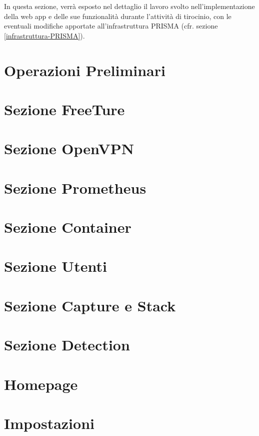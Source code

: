 In questa sezione, verrà esposto nel dettaglio il lavoro svolto nell'implementazione della web app e delle sue funzionalità durante l'attività di tirocinio, con le eventuali modifiche apportate all'infrastruttura PRISMA (cfr. sezione \ref{infrastruttura-PRISMA}).

\section{Operazioni Preliminari}


\section{Sezione FreeTure} \label{sezione-freeture}


\section{Sezione OpenVPN} \label{sezione-OVPN}


\section{Sezione Prometheus} \label{sezione-prometheus}


\section{Sezione Container} \label{sezione-container}


\section{Sezione Utenti} \label{sezione-utenti}


\section{Sezione Capture e Stack} \label{sezione-capture-stack}


\section{Sezione Detection} \label{sezione-detection}


\section{Homepage}


\section{Impostazioni}
